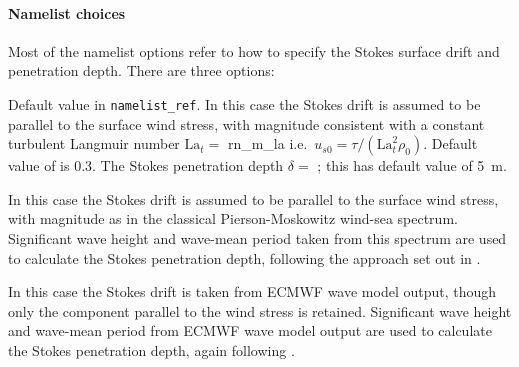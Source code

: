 \documentclass[../main/NEMO_manual]{subfiles}
\begin{document}
\paragraph{Namelist choices}
Most of the namelist options refer to how to specify the Stokes
surface drift and penetration depth. There are three options:
\begin{description}
  \item \protect{} Default value in \texttt{namelist\_ref}. In this case the Stokes drift is
      assumed to be parallel to the surface wind stress, with
      magnitude consistent with a constant turbulent Langmuir number
    $\mathrm{La}_t=$ \protect{} i.e.\
    $u_{s0}=\tau/(\mathrm{La}_t^2\rho_0)$.  Default value of
    \protect\np{rn_m_la}{rn\_m\_la} is 0.3. The Stokes penetration
      depth $\delta = $ \protect{}; this has default value
      of 5~m.

  \item \protect{} In this case the Stokes drift is
      assumed to be parallel to the surface wind stress, with
      magnitude as in the classical Pierson-Moskowitz wind-sea
      spectrum.  Significant wave height and
      wave-mean period taken from this spectrum are used to calculate the Stokes penetration
      depth, following the approach set out in  \citet{breivik.janssen.ea_JPO14}.

    \item \protect{} In this case the Stokes drift is
      taken from  ECMWF wave model output, though only the component parallel
      to the wind stress is retained. Significant wave height and
      wave-mean period from ECMWF wave model output are used to calculate the Stokes penetration
      depth, again following \citet{breivik.janssen.ea_JPO14}.

    \end{description}
\end{document}
